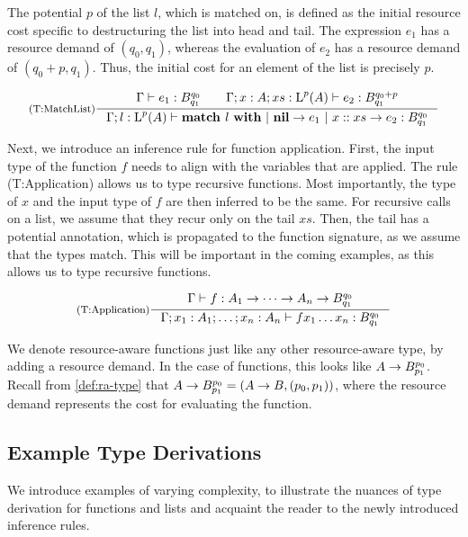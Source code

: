 The potential \(p\) of the list \(l\), which is matched on, is defined as the initial resource cost specific to destructuring the list into head and tail. The expression \(e_1\) has a resource demand of \((q_0, q_1)\), whereas the evaluation of \(e_2\) has a resource demand of \((q_0 + p, q_1)\). Thus, the initial cost for an element of the list is precisely \(p\).  

\[
   \inference[(T:MatchList)]
   {\typing{\Gamma}{e_1}{\ratype{B}{q_0}{q_1}} \qquad \typing{\Gamma;x : A; xs : \ralist{p}{A}}{e_2}{\ratype{B}{q_0 + p}{q_1}}}
   {\typing{\Gamma;l : \ralist{p}{A}}{\listmatch{l}{e_1}{e_2}}{\ratype{B}{q_0}{q_1}}}
\]

Next, we introduce an inference rule for function application. First, the input type of the function \(f\) needs to align with the variables that are applied. The rule (T:Application) allows us to type recursive functions. Most importantly, the type of \(x\) and the input type of \(f\) are then inferred to be the same. For recursive calls on a list, we assume that they recur only on the tail \(xs\). Then, the tail has a potential annotation, which is propagated to the function signature, as we assume that the types match. This will be important in the coming examples, as this allows us to type recursive functions.

\[
   \inference[(T:Application)]
   {\typing{\Gamma}{f}{A_1 \to \dots \to A_n \to \ratype{B}{q_0}{q_1}}}
   {\typing{\Gamma;x_1:A_1;\dots;x_n:A_n}{f x_1 \dots x_n}{\ratype{B}{q_0}{q_1}}}
\]

\begin{remark}
   We denote resource-aware functions just like any other resource-aware type, by adding a resource demand. In the case of functions, this looks like \(A \to B ^{p_0}_{p_1}\). Recall from \cref{def:ra-type} that \(A \to B ^{p_0}_{p_1} = (A \to B, (p_0, p_1))\), where the resource demand represents the cost for evaluating the function.
\end{remark}

\subsection{Example Type Derivations}\label{sec:example-type-derivations}

We introduce examples of varying complexity, to illustrate the nuances of type derivation for functions and lists and acquaint the reader to the newly introduced inference rules.


